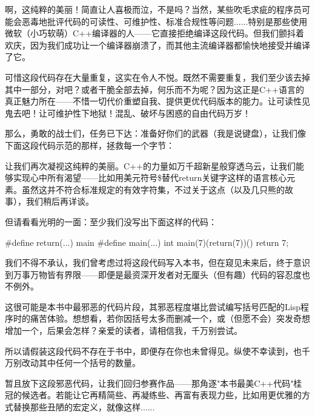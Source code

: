 啊，这纯粹的美丽！简直让人喜极而泣，不是吗？当然，某些吹毛求疵的程序员可能会恶毒地批评代码的可读性、可维护性、标准合规性等问题......特别是那些使用微软（小巧软萌）C++编译器的人——它直接拒绝编译这段代码。但我们颤抖着欢庆，因为我们成功让一个编译器崩溃了，而其他主流编译器都愉快地接受并编译了它。

可惜这段代码存在大量重复，这实在令人不悦。既然不需要重复，我们至少该去掉其中一部分，对吧？或者干脆全部去掉，何乐而不为呢？因为这正是C++语言的真正魅力所在——不惜一切代价重塑自我、提供更优代码版本的能力。让可读性见鬼去吧！让可维护性下地狱！混乱、破坏与困惑的自由代码万岁！

那么，勇敢的战士们，任务已下达：准备好你们的武器（我是说键盘），让我们像下面这段代码示范的那样，拯救每一个字节：


让我们再次凝视这纯粹的美丽。C++的力量如万千超新星般穿透乌云，让我们能够实现心中所有渴望——比如用美元符号\$替代return关键字这样的语言核心元素。虽然这并不符合标准规定的有效字符集，不过关于这点（以及几只熊的故事），我们稍后再详谈。

但请看看光明的一面：至少我们没写出下面这样的代码：

\begin{cpp}
#define return(...) main
#define main(...) int
main(7)(return(7))(){
  return 7;
}
\end{cpp}

我们不得不承认，我们曾考虑过将这段代码写入本书，但在窥见未来后，终于意识到万事万物皆有界限——即便是最资深开发者对无厘头（但有趣）代码的容忍度也不例外。

这很可能是本书中最邪恶的代码片段，其邪恶程度堪比尝试编写括号匹配的Lisp程序时的痛苦体验。想想看，若你因括号太多而删减一个，或（但愿不会）突发奇想增加一个，后果会怎样？亲爱的读者，请相信我，千万别尝试。

所以请假装这段代码不存在于书中，即便存在你也未曾得见。纵使不幸读到，也千万别改动其中任何一个括号的数量。

暂且放下这段邪恶代码，让我们回归参赛作品——那角逐"本书最美C++代码"桂冠的候选者。若能让它再精简些、再凝练些、再富有表现力些，比如用更优雅的方式替换那些丑陋的宏定义，就像这样......



